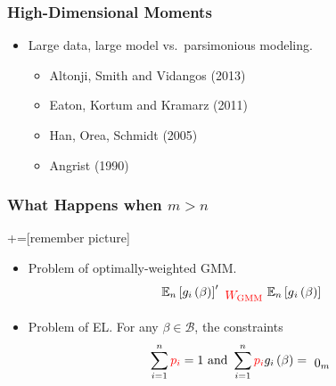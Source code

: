 \documentclass{beamer}
\begin{document}
\begin{frame}
\frametitle{High-Dimensional Moments}
\begin{itemize}
\item 
Large data, large model vs.~parsimonious modeling.\pause
\begin{itemize}
\item Altonji, Smith and Vidangos (2013)
\item Eaton, Kortum and Kramarz (2011)
\item Han, Orea, Schmidt (2005)
\item Angrist (1990)\pause
\end{itemize}
\end{itemize}

\end{frame}


\begin{frame}
\frametitle{What Happens when \(m>n\)}
+=[remember picture]
\begin{itemize} 
\item <1-> Problem of optimally-weighted GMM.  
\[ \mathbb{E}_{n}\left[g_{i}\left(\beta\right)\right]' 
\tikz[baseline]{\node  [color = red] (p0) {$W_{\mathrm{GMM}}$}; } 
\mathbb{E}_{n}\left[g{}_{i}\left(\beta\right)\right] \]


\item <3-> Problem of EL. For any $\beta\in\mathcal{B}$, the constraints 
\[ 
\sum_{i=1}^{n}{\color{red}p_{i}}=1\mbox{ and }
\sum_{i=1}^{n}{\color{red}p_{i}}g_{i}\left(\beta\right)= \tikz[baseline] {\node (n2) {$0_m$}; } \]
\end{itemize} 

\end{frame}
\end{document}
